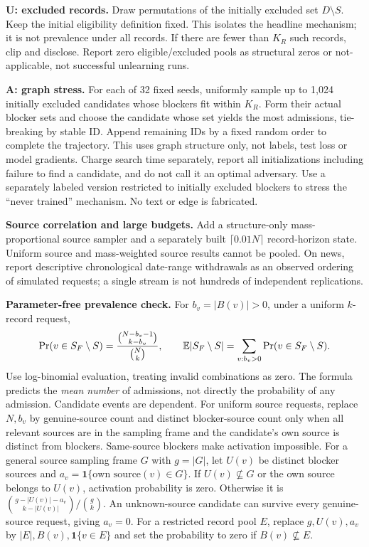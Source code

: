 \documentclass[11pt,a4paper]{article}
\newcommand{\minus}{\setminus}
\begin{document}
\textbf{U: excluded records.} Draw permutations of the initially excluded set $D\minus S$. Keep the initial eligibility definition fixed. This isolates the headline mechanism; it is not prevalence under all records. If there are fewer than $K_R$ such records, clip and disclose. Report zero eligible/excluded pools as structural zeros or not-applicable, not successful unlearning runs.

\textbf{A: graph stress.} For each of 32 fixed seeds, uniformly sample up to 1,024 initially excluded candidates whose blockers fit within $K_R$. Form their actual blocker sets and choose the candidate whose set yields the most admissions, tie-breaking by stable ID. Append remaining IDs by a fixed random order to complete the trajectory. This uses graph structure only, not labels, test loss or model gradients. Charge search time separately, report all initializations including failure to find a candidate, and do not call it an optimal adversary. Use a separately labeled version restricted to initially excluded blockers to stress the ``never trained'' mechanism. No text or edge is fabricated.

\textbf{Source correlation and large budgets.} Add a structure-only mass-proportional source sampler and a separately built $\lceil0.01N\rceil$ record-horizon state. Uniform source and mass-weighted source results cannot be pooled. On news, report descriptive chronological date-range withdrawals as an observed ordering of simulated requests; a single stream is not hundreds of independent replications.

\textbf{Parameter-free prevalence check.} For $b_v=|B(v)|>0$, under a uniform $k$-record request,
\[
 \Pr(v\in S_F\minus S)=\frac{\binom{N-b_v-1}{k-b_v}}{\binom Nk},\qquad
 \E|S_F\minus S|=\sum_{v:b_v>0}\Pr(v\in S_F\minus S).
\]
Use log-binomial evaluation, treating invalid combinations as zero. The formula predicts the \emph{mean number} of admissions, not directly the probability of any admission. Candidate events are dependent. For uniform source requests, replace $N,b_v$ by genuine-source count and distinct blocker-source count only when all relevant sources are in the sampling frame and the candidate's own source is distinct from blockers. Same-source blockers make activation impossible. For a general source sampling frame $G$ with $g=|G|$, let $U(v)$ be distinct blocker sources and $a_v=\mathbf 1\{\text{own source}(v)\in G\}$. If $U(v)\not\subseteq G$ or the own source belongs to $U(v)$, activation probability is zero. Otherwise it is $\binom{g-|U(v)|-a_v}{k-|U(v)|}/\binom gk$. An unknown-source candidate can survive every genuine-source request, giving $a_v=0$. For a restricted record pool $E$, replace $g,U(v),a_v$ by $|E|,B(v),\mathbf 1\{v\in E\}$ and set the probability to zero if $B(v)\not\subseteq E$.
\end{document}
